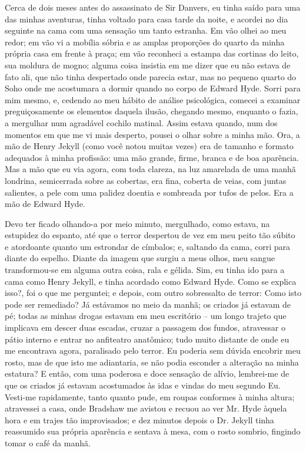 Cerca de dois meses antes do assassinato de Sir Danvers, eu tinha saído
para uma das minhas aventuras, tinha voltado para casa tarde da noite,
e acordei no dia seguinte na cama com uma sensação um tanto estranha. 
Em vão olhei ao meu redor; em vão vi a mobília sóbria e as amplas
proporções do quarto da minha própria casa em frente à praça; em vão
reconheci a estampa das cortinas do leito, sua moldura de mogno; alguma
coisa insistia em me dizer que eu não estava de fato ali, que não tinha
despertado onde parecia estar, mas no pequeno quarto do Soho onde me
acostumara a dormir quando no corpo de Edward Hyde.  Sorri para mim
mesmo, e, cedendo ao meu hábito de análise psicológica, comecei a
examinar preguiçosamente os elementos daquela ilusão, chegando mesmo,
enquanto o fazia, a mergulhar num agradável cochilo matinal.  Assim
estava quando, num dos momentos em que me vi mais desperto, pousei o
olhar sobre a minha mão.  Ora, a mão de Henry Jekyll (como você notou
muitas vezes) era de tamanho e formato adequados à minha profissão: uma
mão grande, firme, branca e de boa aparência. Mas a mão que eu via
agora, com toda clareza, na luz amarelada de uma manhã londrina,
semicerrada sobre as cobertas, era fina, coberta de veias, com juntas
salientes, a pele com uma palidez doentia e sombreada por tufos de
pelos.  Era a mão de Edward Hyde.

Devo ter ficado olhando-a por meio minuto, mergulhado, como estava, na
estupidez do espanto, até que o terror despertou de vez em meu peito
tão súbito e atordoante quanto um estrondar de címbalos; e, saltando da
cama, corri para diante do espelho.  Diante da imagem que surgiu
a meus olhos, meu sangue transformou-se em alguma outra coisa, rala e
gélida.  Sim, eu tinha ido para a cama como Henry Jekyll, e tinha
acordado como Edward Hyde.  Como se explica isso?, foi o que me
perguntei; e depois, com outro sobressalto de terror: Como isto pode
ser remediado?  Já estávamos no meio da manhã; os criados já estavam de
pé; todas as minhas drogas estavam em meu escritório -- um longo trajeto
que implicava em descer duas escadas, cruzar a passagem dos fundos,
atravessar o pátio interno e entrar no anfiteatro anatômico; tudo muito
distante de onde eu me encontrava agora, paralisado pelo terror.  Eu
poderia sem dúvida encobrir meu rosto, mas de que isto me adiantaria,
se não podia esconder a alteração na minha estatura?  E então, com uma
poderosa e doce sensação de alívio, lembrei-me de que os criados já
estavam acostumados às idas e vindas do meu segundo Eu.  Vesti-me
rapidamente, tanto quanto pude, em roupas conformes à minha altura;
atravessei a casa, onde Bradshaw me avistou e recuou ao ver Mr. Hyde
àquela hora e em trajes tão improvisados; e dez minutos depois o Dr.
Jekyll tinha reassumido sua própria aparência e sentava à mesa, com o
rosto sombrio, fingindo tomar o café da manhã.

